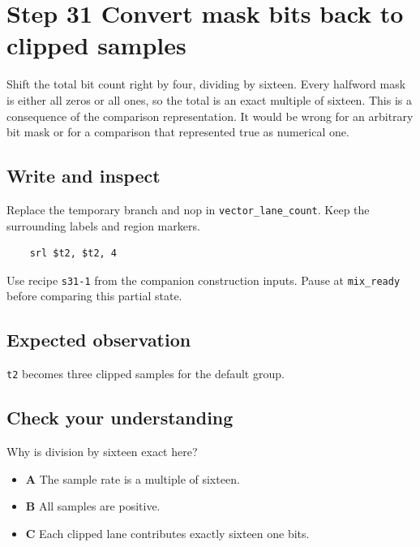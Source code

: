 \section{Step 31 Convert mask bits back to clipped samples}\label{pcm-s31}

Shift the total bit count right by four, dividing by sixteen. Every halfword mask is either all zeros or all ones, so the total is an exact multiple of sixteen. This is a consequence of the comparison representation. It would be wrong for an arbitrary bit mask or for a comparison that represented true as numerical one.

\subsection{Write and inspect}
Replace the temporary branch and nop in \texttt{vector\_lane\_count}. Keep the surrounding labels and region markers.

\begin{verbatim}
    srl $t2, $t2, 4
\end{verbatim}
Use recipe \texttt{s31-1} from the companion construction inputs. Pause at \texttt{mix\_ready} before comparing this partial state.

\subsection{Expected observation}
\texttt{t2} becomes three clipped samples for the default group.

\subsection{Check your understanding}
Why is division by sixteen exact here?

\begin{itemize}
  \item \textbf{A} The sample rate is a multiple of sixteen.
  \item \textbf{B} All samples are positive.
  \item \textbf{C} Each clipped lane contributes exactly sixteen one bits.
\end{itemize}
